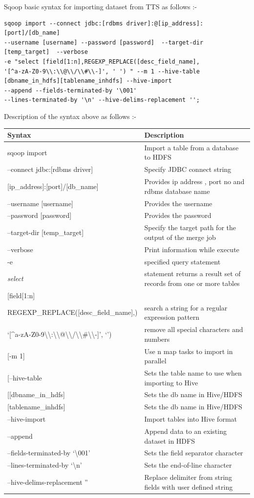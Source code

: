 \documentclass[]{article}
\begin{document}
Sqoop basic syntax for importing dataset from TTS as follows :-

\begin{verbatim}
sqoop import --connect jdbc:[rdbms driver]:@[ip_address]:[port]/[db_name] 
--username [username] --password [password]  --target-dir [temp_target]  --verbose 
-e "select [field[1:n],REGEXP_REPLACE([desc_field_name],
'[^a-zA-Z0-9\\:\\@\\/\\#\\-]', ' ') " --m 1 --hive-table 
[dbname_in_hdfs][tablename_inhdfs] --hive-import
--append --fields-terminated-by '\001'  
--lines-terminated-by '\n' --hive-delims-replacement '';
\end{verbatim}

\pagebreak

Description of the syntax above as follows :-

\begin{longtable}[c]{@{}ll@{}}
\toprule
Syntax & Description\tabularnewline
\midrule
\endhead
sqoop import & Import a table from a database to HDFS\tabularnewline
--connect jdbc:{[}rdbms driver{]} & Specify JDBC connect
string\tabularnewline
{[}ip\_address{]}:{[}port{]}/{[}db\_name{]} & Provides ip address , port
no and rdbms database name\tabularnewline
--username {[}username{]} & Provides the username\tabularnewline
--password {[}password{]} & Provides the password\tabularnewline
--target-dir {[}temp\_target{]} & Specify the target path for the output
of the merge job\tabularnewline
--verbose & Print information while execute\tabularnewline
-e & specified query statement\tabularnewline
\emph{select} & statement returns a result set of records from one or
more tables\tabularnewline
{[}field{[}1:n{]} &\tabularnewline
REGEXP\_REPLACE({[}desc\_field\_name{]},) & search a string for a
regular expression pattern\tabularnewline
`{[}\^{}a-zA-Z0-9\textbackslash{}\textbackslash{}:\textbackslash{}\textbackslash{}@\textbackslash{}\textbackslash{}/\textbackslash{}\textbackslash{}\#\textbackslash{}\textbackslash{}-{]}',
`') & remove all special characters and numbers\tabularnewline
{[}-m 1{]} & Use n map tasks to import in parallel\tabularnewline
{[}--hive-table & Sets the table name to use when importing to
Hive\tabularnewline
{[}{[}dbname\_in\_hdfs{]} & Sets the db name in Hive/HDFS\tabularnewline
{[}tablename\_inhdfs{]} & Sets the db name in Hive/HDFS\tabularnewline
--hive-import & Import tables into Hive format\tabularnewline
--append & Append data to an existing dataset in HDFS\tabularnewline
--fields-terminated-by `\textbackslash{}001' & Sets the field separator
character\tabularnewline
--lines-terminated-by `\textbackslash{}n' & Sets the end-of-line
character\tabularnewline
--hive-delims-replacement '' & Replace delimiter from string fields with
user defined string\tabularnewline
\bottomrule
\end{longtable}
\end{document}
